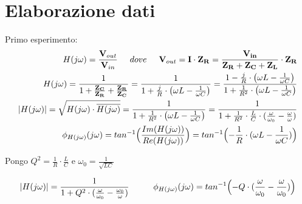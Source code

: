     \section{Elaborazione dati}
    Primo esperimento:
    \begin{equation}
        \begin{split}
            H(j\omega) = \frac{\mathbf{V}_{out}}{\mathbf{V}_{in}}
            \hspace{0.5cm} dove \hspace{0.5cm} \mathbf{V}_{out} = \mathbf{I} \cdot \mathbf{Z_{R}} = \frac{\mathbf{V_{in}}}{\mathbf{Z_R} + \mathbf{Z_C} + \mathbf{Z_L}}
            \cdot \mathbf{Z_R}
            \\
            H(j\omega) =  \frac{1}{1+\frac{\mathbf{Z_C}}{\mathbf{Z_R}} + \frac{\mathbf{Z_R}}{\mathbf{Z_C}}}
            = \frac{1}{1+\frac{j}{R} \cdot \bigl (\omega L - \frac{1}{\omega C} \bigr )} = 
            \frac{1 - \frac{j}{R} \cdot \bigl (\omega L - \frac{1}{\omega C} \bigr )}{1 + \frac{1}{R^2} \cdot \bigl (\omega L - \frac{1}{\omega C} \bigr )}
            \\
            |H(j\omega)| = \sqrt{H(j\omega) \cdot \overline{H(j\omega)}} = \frac{1}{1 + \frac{1}{R^2} \cdot \bigl (\omega L - \frac{1}{\omega C} \bigr )} =
            \frac{1}{1+\frac{1}{R^2}\cdot\frac{L}{C}\cdot(\frac{\omega}{\omega_0} - \frac{\omega}{\omega})} 
            \\
            \phi_{H(j\omega)}(j\omega) = tan^{-1} \Bigl (\frac{Im(H(j\omega))}{Re(H(j\omega))}\Bigr )
            = tan^{-1} \Bigl (-\frac{1}{R} \cdot (\omega L - \frac{1}{\omega C})\Bigr )
        \end{split}
    \end{equation}

    \begin{center}
    Pongo $Q^2 = \frac{1}{R} \cdot \frac{L}{C}$ e $\omega_0 = \frac {1}{\sqrt{LC}}$
    \end{center}

    \begin{equation}
        \begin{split}
            |H(j\omega)| = \frac{1}{1 + Q^2 \cdot (\frac{\omega}{\omega_0} - \frac{\omega_0}{\omega})}
            \hspace{1cm}
            \phi_{H(j\omega)}(j\omega) = tan^{-1} \Bigl (-Q \cdot(\frac{\omega}{\omega_0} - \frac{\omega}{\omega_0}) \Bigr )
        \end{split}
    \end{equation}

